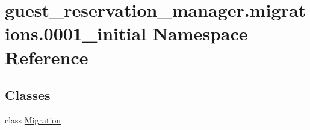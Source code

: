 \hypertarget{namespaceguest__reservation__manager_1_1migrations_1_10001__initial}{\section{guest\-\_\-reservation\-\_\-manager.\-migrations.0001\-\_\-initial Namespace Reference}
\label{namespaceguest__reservation__manager_1_1migrations_1_10001__initial}
}
\subsection*{Classes}
\begin{DoxyCompactItemize}
\item 
class \hyperlink{classguest__reservation__manager_1_1migrations_1_10001__initial_1_1Migration}{Migration}
\end{DoxyCompactItemize}
